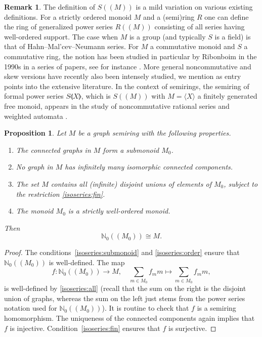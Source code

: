 \documentclass{amsart}
\theoremstyle{plain}
\newtheorem{proposition}[thm]{Proposition}
\theoremstyle{definition}
\newtheorem{remark}[thm]{Remark}
\newcommand{\bN}{\mathbb N}
\newcommand{\hmnser}[2]{{#1}(\!({#2})\!)}
\begin{document}
\begin{remark}
  The definition of $\hmnser{S}{M}$ is a mild variation on various existing definitions.
  For a strictly ordered monoid $M$ and a (semi)ring $R$ one can define the ring of generalized power series $R(\!(M)\!)$ consisting of all series having well-ordered support.
  The case when $M$ is a group (and typically $S$ is a field) is that of Hahn--Mal'cev--Neumann series.
  For $M$ a commutative monoid and $S$ a commutative ring, the notion has been studied in particular by Ribonboim in the 1990s in a series of papers, see for instance \cite{ribenboim92}.
  More general noncommutative and skew versions have recently also been intensely studied, we mention \cite{mazurek-paykan17,tuganbaev20} as entry points into the extensive literature.
  In the context of semirings, the semiring of formal power series $S\llangle X \rrangle$, which is $\hmnser{S}{M}$ with $M=\langle X \rangle$ a finitely generated free monoid, appears in the study of noncommutative rational series and weighted automata \cite{berstel-reutenauer11}.
\end{remark}

\begin{proposition} \label{p:iso-series}
  Let $M$ be a graph semiring with the following properties.
  \begin{enumerate}
  \item \label{isoseries:submonoid} The connected graphs in $M$ form a submonoid $M_0$.
  \item \label{isoseries:fin} No graph in $M$ has infinitely many isomorphic connected components.
  \item \label{isoseries:all} The set $M$ contains all \textup(infinite\textup) disjoint unions of elements of $M_0$, subject to the restriction \textup{\ref{isoseries:fin}}.
  \item \label{isoseries:order} The monoid $M_0$ is a strictly well-ordered monoid.
  \end{enumerate}
  Then
  \[
    \hmnser{\bN_0}{M_0} \cong M.
  \]
\end{proposition}

\begin{proof}
  The conditions~\ref{isoseries:submonoid} and \ref{isoseries:order} ensure that $\hmnser{\bN_0}{M_0}$ is well-defined.
  The map
  \[
  f\colon \hmnser{\bN_0}{M_0} \to M,\quad \sum_{m \in M_0} f_m m \mapsto \sum_{m \in M_0} f_m m,
  \]
  is well-defined by \ref{isoseries:all} (recall that the sum on the right is the disjoint union of graphs, whereas the sum on the left just stems from the power series notation used for $\hmnser{\bN_0}{M_0}$).
  It is routine to check that $f$ is a semiring homomorphism.
  The uniqueness of the connected components again implies that $f$ is injective.
  Condition~\ref{isoseries:fin} ensures that $f$ is surjective.
\end{proof}
\end{document}
